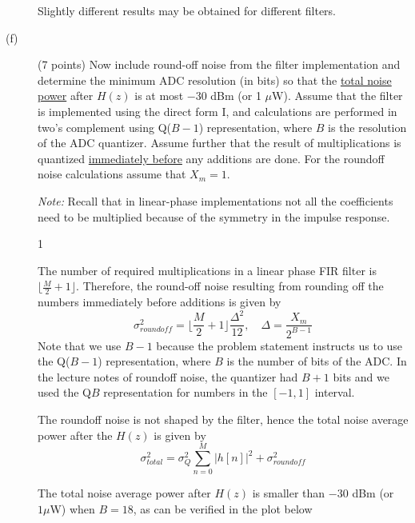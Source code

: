 \documentclass[10pt]{article}
\def\SOLUTIONS{1} %
\def\SolutionsColor{red2}
\begin{document}
\begin{description}
{		Slightly different results may be obtained for different filters.
	}\fi
	
	\item[(f)] (7 points) Now include round-off noise from the filter implementation and determine the minimum ADC resolution (in bits) so that the \underline{total noise power} after $H(z)$ is at most $-30$ dBm (or 1 $\mu$W). Assume that the filter is implemented using the direct form I, and calculations are performed in two's complement using Q($B-1$) representation, where $B$ is the resolution of the ADC quantizer. Assume further that the result of multiplications is quantized \underline{immediately before} any additions are done. For the roundoff noise calculations assume that $X_m = 1$.
		
	\noindent\textit{Note:} Recall that in linear-phase implementations not all the coefficients need to be multiplied because of the symmetry in the impulse response.
	
	\if\SOLUTIONS1 {\color{\SolutionsColor} The number of required multiplications in a linear phase FIR filter is $\lfloor \frac{M}{2} + 1 \rfloor$. Therefore, the round-off noise resulting from rounding off the numbers immediately before additions is given by
	\begin{equation*}
		\sigma_{roundoff}^2 = \Big\lfloor \frac{M}{2} + 1 \Big\rfloor\frac{\Delta^2}{12}, \quad\Delta = \frac{X_m}{2^{B-1}}
	\end{equation*}
	Note that we use $B-1$ because the problem statement instructs us to use the Q($B-1$) representation, where $B$ is the number of bits of the ADC. In the lecture notes of roundoff noise, the quantizer had $B+1$ bits and we used the Q$B$ representation for numbers in the $[-1, 1]$ interval. 
	
	The roundoff noise is not shaped by the filter, hence the total noise average power after the $H(z)$ is given by
	\begin{equation*}
		\sigma^2_{total} = \sigma_Q^2\sum_{n = 0}^{M}|h[n]|^2 + \sigma_{roundoff}^2
	\end{equation*}
	
	The total noise average power after $H(z)$ is smaller than $-30$ dBm (or $1 \mu$W) when $B = 18$, as can be verified in the plot below
	
}
\end{description}
\end{document}
